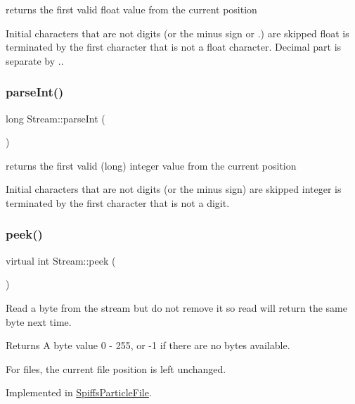 returns the first valid float value from the current position 

Initial characters that are not digits (or the minus sign or .) are skipped float is terminated by the first character that is not a float character. Decimal part is separate by \textquotesingle{}.\textquotesingle{}. \mbox{\label{class_stream_a497ffcbcb4d5bb889a8fde487bcc1b98}} 
\subsubsection{\texorpdfstring{parse\+Int()}{parseInt()}}
{\footnotesize\ttfamily long Stream\+::parse\+Int (\begin{DoxyParamCaption}{ }\end{DoxyParamCaption})}



returns the first valid (long) integer value from the current position 

Initial characters that are not digits (or the minus sign) are skipped integer is terminated by the first character that is not a digit. \mbox{\label{class_stream_a30c3c212ec6ea67277a708c5ea2501a5}} 
\subsubsection{\texorpdfstring{peek()}{peek()}}
{\footnotesize\ttfamily virtual int Stream\+::peek (\begin{DoxyParamCaption}{ }\end{DoxyParamCaption})\hspace{0.3cm}{\ttfamily [pure virtual]}}



Read a byte from the stream but do not remove it so read will return the same byte next time. 

\begin{DoxyReturn}{Returns}
A byte value 0 -\/ 255, or -\/1 if there are no bytes available.
\end{DoxyReturn}
For files, the current file position is left unchanged. 

Implemented in \mbox{\hyperlink{class_spiffs_particle_file_a2d6135f557d39fa6229aea72f8aab855}{Spiffs\+Particle\+File}}.

